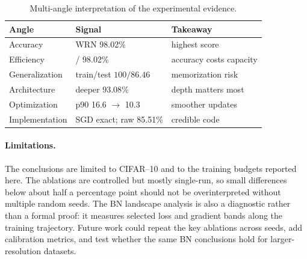 \documentclass[11pt]{article}
\newcommand{\bestAcc}{98.02}     %
\newcommand{\baseAcc}{95.34}     %
\newcommand{\manualNetAcc}{85.51} %
\newcommand{\bnGradStd}{16.6}
\newcommand{\bnGradBn}{10.3}
\begin{document}
\begin{table}[htbp]
\centering
\small
\caption{Multi-angle interpretation of the experimental evidence.}
\label{tab:discussionangles}
\begin{tabularx}{\textwidth}{l>{\raggedright\arraybackslash}p{}X}
\toprule
Angle & Signal & Takeaway \\
\midrule
Accuracy & WRN \bestAcc\% & highest score \\
Efficiency & \baseAcc{} / \bestAcc\% & accuracy costs capacity \\
Generalization & train/test $100/86.46$ & memorization risk \\
Architecture & deeper $93.08\%$ & depth matters most \\
Optimization & p90 \bnGradStd{} $\rightarrow$ \bnGradBn{} & smoother updates \\
Implementation & SGD exact; raw \manualNetAcc\% & credible code \\
\bottomrule
\end{tabularx}
\end{table}

\paragraph{Limitations.}
The conclusions are limited to CIFAR--10 and to the training budgets reported
here. The ablations are controlled but mostly single-run, so small differences
below about half a percentage point should not be overinterpreted without
multiple random seeds. The BN landscape analysis is also a diagnostic rather
than a formal proof: it measures selected loss and gradient bands along the
training trajectory. Future work could repeat the key ablations across seeds,
add calibration metrics, and test whether the same BN conclusions hold for
larger-resolution datasets.

\end{document}

